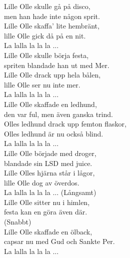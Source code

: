 \documentclass[a6paper, 10pt, twoside]{article}
\begin{document}
\begin{center}
\end{center}
\begin{lyrics}
Lille Olle skulle gå på disco, \\
men han hade inte någon sprit.\\ 
Lille Olle skaffa' lite hembränt, \\
lille Olle gick då på en nit. \\
\newline
La lalla la la la ... \\
\newline
Lille Olle skulle börja festa, \\
spriten blandade han ut med Mer. \\
Lille Olle drack upp hela bålen, \\
lille Olle ser nu inte mer. \\
\newline
La lalla la la la ... \\
\newline
Lille Olle skaffade en ledhund,\\ 
den var ful, men även ganska trind. \\
Olles ledhund drack upp femton flaskor,\\ 
Olles ledhund är nu också blind. \\
\newline
La lalla la la la ... \\
\newline 
Lille Olle började med droger, \\
blandade sin LSD med juice. \\
Lille Olles hjärna står i lågor, \\
lille Olle dog av överdos. \\
\newline
La lalla la la la ... 
\newpage
\noindent
(Långsamt) \\
Lille Olle sitter nu i himlen, \\
festa kan en göra även där.\\ 
(Snabbt) \\
Lille Olle skaffade en ölback, \\
capsar nu med Gud och Sankte Per. \\
\newline
La lalla la la la ...
\end{lyrics}
\begin{center}
\end{center}
\end{document}
